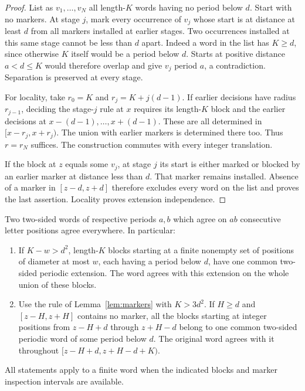 \begin{proof}
List as $v_1,\ldots,v_N$ all length-$K$ words having no period below $d$.
Start with no markers.  At stage $j$, mark every occurrence of $v_j$ whose
start is at distance at least $d$ from all markers installed at earlier
stages.  Two occurrences installed at this same stage cannot be less than
$d$ apart.  Indeed a word in the list has $K\ge d$, since otherwise $K$
itself would be a period below $d$.  Starts at positive distance
$a<d\le K$ would therefore overlap and give $v_j$ period $a$, a
contradiction.  Separation is preserved at every stage.

For locality, take $r_0=K$ and $r_j=K+j(d-1)$.  If earlier decisions have
radius $r_{j-1}$, deciding the stage-$j$ rule at $x$ requires its length-$K$
block and the earlier decisions at $x-(d-1),\ldots,x+(d-1)$.  These are all
determined in $[x-r_j,x+r_j)$.  The union with earlier markers is determined
there too.  Thus $r=r_N$ suffices.  The construction commutes with every
integer translation.

If the block at $z$ equals some $v_j$, at stage $j$ its start is either
marked or blocked by an earlier marker at distance less than $d$.
That marker remains installed.  Absence of a marker in $[z-d,z+d]$
therefore excludes every word on the list and proves the last assertion.
Locality proves extension independence.
\end{proof}

\begin{lemma}\label{lem:periodic-overlap}
Two two-sided words of respective periods $a,b$ which agree on $ab$
consecutive letter positions agree everywhere.  In particular:
\begin{enumerate}[label=\textnormal{(\roman*)}]
\item If $K-w>d^2$, length-$K$ blocks starting at a finite nonempty set
of positions of diameter at most $w$, each having a period below $d$,
have one common two-sided periodic extension.  The word agrees with this
extension on the whole union of these blocks.
\item Use the rule of Lemma~\ref{lem:markers} with $K>3d^2$.
If $H\ge d$ and $[z-H,z+H]$ contains no marker, all the blocks starting
at integer positions from $z-H+d$ through $z+H-d$ belong to one common
two-sided periodic word of some period below $d$.  The original word
agrees with it throughout $[z-H+d,z+H-d+K)$.
\end{enumerate}
All statements apply to a finite word when the indicated blocks and
marker inspection intervals are available.
\end{lemma}

